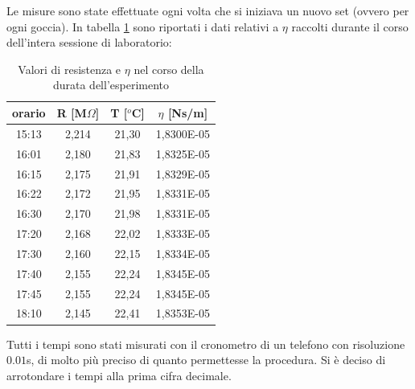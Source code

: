 \documentclass{article}
\begin{document}
        Le misure sono state effettuate ogni volta che si iniziava un nuovo set (ovvero per ogni goccia).
        In tabella \ref{eta} sono riportati i dati relativi a $\eta$ raccolti durante il corso dell'intera sessione di laboratorio: \\
        \begin{table}[H]
        \centering
            \begin{tabular}{ cccc } 
                \toprule 
                orario & R [M$\Omega$] & T [$^o$C] & $\eta$ [Ns/m] \\
                \midrule 
                15:13 &	2,214	&	21,30	&	1,8300E-05  \\
                16:01 &	2,180	&	21,83	&	1,8325E-05  \\	
                16:15 &	2,175	&	21,91	&	1,8329E-05	\\
                16:22 &	2,172	&	21,95	&	1,8331E-05	\\
                16:30 & 2,170	&	21,98	&	1,8331E-05	\\
                17:20 &	2,168	&	22,02	&	1,8333E-05	\\
                17:30 & 2,160	&   22,15	&	1,8334E-05	\\
                17:40 &	2,155	&	22,24	&	1,8345E-05	\\
                17:45 &	2,155	&	22,24	&	1,8345E-05	\\
                18:10 &	2,145	&	22,41	&	1,8353E-05	\\
                \bottomrule           
            \end{tabular}
            \caption{Valori di resistenza e $\eta$ nel corso della durata dell'esperimento}
            \label{eta}
        \end{table}
        Tutti i tempi sono stati misurati con il cronometro di un telefono con risoluzione $0.01$s, di molto più preciso di quanto permettesse la procedura. Si è deciso di arrotondare i tempi alla prima cifra decimale.
\end{document}
